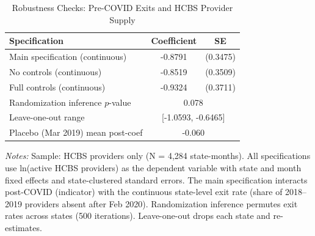 \begin{table}[t]
\centering
\caption{Robustness Checks: Pre-COVID Exits and HCBS Provider Supply}
\label{tab:robustness}
\begin{tabular}{lcc}
\toprule
Specification & Coefficient & SE \\
\midrule
Main specification (continuous) & -0.8791 & (0.3475) \\
No controls (continuous) & -0.8519 & (0.3509) \\
Full controls (continuous) & -0.9324 & (0.3711) \\
\midrule
Randomization inference $p$-value & \multicolumn{2}{c}{0.078} \\
Leave-one-out range & \multicolumn{2}{c}{[-1.0593, -0.6465]} \\
Placebo (Mar 2019) mean post-coef & \multicolumn{2}{c}{-0.060} \\
\bottomrule
\end{tabular}
\begin{minipage}{0.9\textwidth}
\vspace{0.2cm}
\footnotesize \textit{Notes:} Sample: HCBS providers only (N = 4,284 state-months). All specifications use ln(active HCBS providers) as the dependent variable with state and month fixed effects and state-clustered standard errors. The main specification interacts post-COVID (indicator) with the continuous state-level exit rate (share of 2018--2019 providers absent after Feb 2020). Randomization inference permutes exit rates across states (500 iterations). Leave-one-out drops each state and re-estimates.
\end{minipage}
\end{table}

